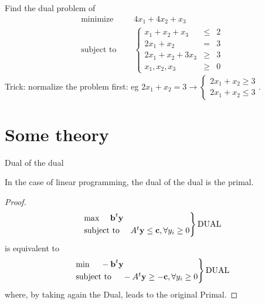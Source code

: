 \documentclass[c]{beamer}
\begin{document}

\begin{frame}{}
\begin{Exercise}
  Find the dual problem of
  \begin{equation*}
  \begin{aligned}
    \text{minimize } \quad & 4x_1 +4x_2+x_3 \\
    \text{subject to }\quad &
    \left\{
    \begin{array}{rcl}
      x_1+x_2+x_3 &\leq &2 \\
      2x_1+x_2 &= &3 \\
      2x_1+x_2+3x_3 &\geq &3 \\
      x_1,x_2,x_3 &\geq& 0
    \end{array}
    \right.
  \end{aligned}
\end{equation*}
Trick: normalize the problem first: eg $2x_1+x_2=3 \rightarrow \begin{cases}2x_1+x_2 \geq 3\\2x_1+x_2\leq 3\end{cases}$.
\end{Exercise}
\end{frame}

\section{Some theory}

\begin{frame}{Dual of the dual}
\begin{theorem}
  In the case of linear programming, the dual of the dual is the primal.
\end{theorem}
\begin{proof}
 \[
\begin{rcases}
\text{max }\quad\textbf{b}^t \textbf{y}\\
\text{subject to }\quad A^t\textbf{y}\leq \textbf{c}, \forall y_i\geq0
\end{rcases} \text{DUAL}
\]
is equivalent to
\[
\begin{rcases}
\text{min }\quad-\textbf{b}^t \textbf{y}\\
\text{subject to }\quad -A^t\textbf{y}\geq -\textbf{c}, \forall y_i\geq0
\end{rcases} \text{DUAL}
\]
where, by taking again the Dual, leads to the original Primal.
\end{proof}
\end{frame}
\end{document}
